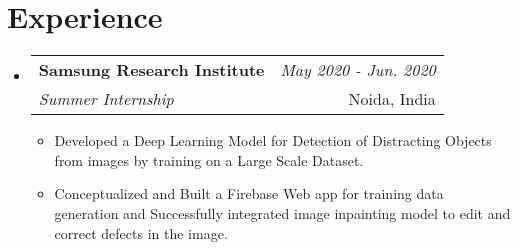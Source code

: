\documentclass[a4paper,11pt]{article}
\makeatletter
\newcommand{\resumeSubheading}[4]{
\vspace{0.5mm}\item
    \begin{tabular*}{0.98\textwidth}[t]{l@{\extracolsep{\fill}}r}
        \textbf{#1} & \textit{\footnotesize{#4}} \\
        \textit{\footnotesize{#3}} &  \footnotesize{#2}\\
    \end{tabular*}
    \vspace{-2.4mm}
}
\newcommand{\resumeSubHeadingListStart}{\begin{itemize}[leftmargin=*,labelsep=0mm]}
\newcommand{\resumeItemListStart}{\begin{justify}\begin{itemize}[leftmargin=3ex, rightmargin=2ex, noitemsep,labelsep=1.2mm,itemsep=0mm]\small}
\newcommand{\resumeSubHeadingListEnd}{\end{itemize}\vspace{2mm}}
\newcommand{\resumeItemListEnd}{\end{itemize}\end{justify}\vspace{-2mm}}
\makeatother
\begin{document}
\section{\textbf{Experience}}
  \resumeSubHeadingListStart
  \vspace{-1mm}
    \resumeSubheading
      {Samsung Research Institute}{Noida, India}
      {Summer Internship}{May 2020 - Jun. 2020}
      \resumeItemListStart
    \item {Developed a Deep Learning Model for Detection of Distracting Objects from images by training on a Large Scale Dataset.}
    \item {Conceptualized and Built a Firebase Web app for training data generation and Successfully integrated image inpainting model to edit and correct defects in the image.}
    \resumeItemListEnd
    
      
  \resumeSubHeadingListEnd
\vspace{-7mm}
\end{document}

